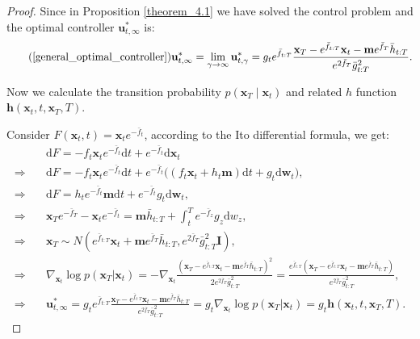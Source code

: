 \begin{proof}
Since in Proposition \ref{theorem_4.1} we have solved the control problem and the optimal controller $\mathbf{u}^{*}_{t, \infty}$ is: 
\begin{equation}\tag{\ref{general_optimal_controller}}
\mathbf{u}^{*}_{t, \infty} = \lim_{\gamma \rightarrow \infty} \mathbf{u}^{*}_{t, \gamma} = g_t e^{\bar{f}_{t:T}} \frac{\mathbf{x}_{T} - e^{\bar{f}_{t:T}} \mathbf{x}_t - \mathbf{m} e^{\bar{f}_{T}} \bar{h}_{t:T}}{e^{2\bar{f}_{T}} \bar{g}^2_{t:T}}.
\end{equation}

Now we calculate the transition probability $p(\mathbf{x}_T \mid \mathbf{x}_t)$ and related $h$ function $\mathbf{h}(\mathbf{x}_t, t, \mathbf{x}_T, T)$. 

Consider $F(\mathbf{x}_t, t) = \mathbf{x}_t e^{-\bar{f}_t}$, according to the Ito differential formula, we get:
\begin{align}\label{general_transition}
& \mathrm{d} F = -f_t \mathbf{x}_t e^{-\bar{f}_t} \mathrm{d} t + e^{-\bar{f}_t} \mathrm{d} \mathbf{x}_t\\
\Rightarrow \quad & \mathrm{d} F = -f_t \mathbf{x}_t e^{-\bar{f}_t} \mathrm{d} t + e^{-\bar{f}_t} \Big( \left(f_t \mathbf{x}_t + h_t \mathbf{m}\right) \mathrm{d} t + g_t \mathrm{d} \mathbf{w}_t \Big), \\
\Rightarrow \quad & \mathrm{d} F = h_t e^{-\bar{f}_t} \mathbf{m} \mathrm{d} t + e^{-\bar{f}_t} g_t \mathrm{d} \mathbf{w}_t, \\
\Rightarrow \quad & \mathbf{x}_T e^{-\bar{f}_T} - \mathbf{x}_t e^{-\bar{f}_t} = \mathbf{m}\bar{h}_{t:T} + \int_{t}^{T} e^{-\bar{f}_z} g_z \mathrm{d} w_z, \\
\Rightarrow \quad & \mathbf{x}_T \sim N\left( e^{\bar{f}_{t:T}} \mathbf{x}_t + \mathbf{m} e^{\bar{f}_T} \bar{h}_{t:T}, e^{2\bar{f}_T}\bar{g}^2_{t:T} \mathbf{I}\right),\\
\Rightarrow \quad & \nabla_{\mathbf{x}_t} \log p(\mathbf{x}_T | \mathbf{x}_t) = -\nabla_{\mathbf{x}_t} \frac{(\mathbf{x}_T - e^{\bar{f}_{t:T}} \mathbf{x}_t - \mathbf{m} e^{\bar{f}_T} \bar{h}_{t:T})^2}{2 e^{2\bar{f}_T}\bar{g}^2_{t:T}} = \frac{e^{\bar{f}_{t:T}}\left(\mathbf{x}_T - e^{\bar{f}_{t:T}} \mathbf{x}_t - \mathbf{m} e^{\bar{f}_T} \bar{h}_{t:T}\right)}{e^{2\bar{f}_T}\bar{g}^2_{t:T}}, \\
\Rightarrow \quad & \mathbf{u}^{*}_{t, \infty} = g_t e^{\bar{f}_{t:T}} \frac{\mathbf{x}_{T} - e^{\bar{f}_{t:T}} \mathbf{x}_t - \mathbf{m} e^{\bar{f}_{T}} \bar{h}_{t:T}}{e^{2\bar{f}_{T}} \bar{g}^2_{t:T}} = g_t \nabla_{\mathbf{x}_t} \log p(\mathbf{x}_T | \mathbf{x}_t) = g_t \mathbf{h}(\mathbf{x}_t, t, \mathbf{x}_T, T).

\end{align}
\end{proof}

